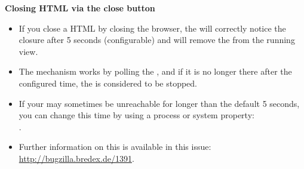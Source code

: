 \textbf{Closing HTML \gdauts{} via the close button}
\begin{itemize}
\item If you close a HTML \gdaut{} by closing the browser, the \ite{} will correctly notice the closure after 5 seconds (configurable) and will remove the \gdaut{} from the running \gdauts{} view.
\item The mechanism works by polling the \gdaut{}, and if it is no longer there after the configured time, the \gdaut{} is considered to be stopped.
\item If your \gdaut{} may sometimes be unreachable for longer than the default 5 seconds, you can change this time by using a process or system property:\\
.
\item Further information on this is available in this issue:\\
\url{http://bugzilla.bredex.de/1391}.
\end{itemize}

